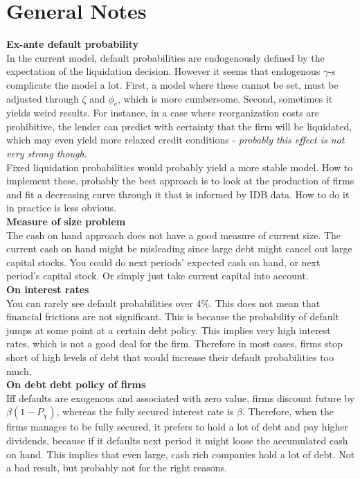 \documentclass[12pt]{article}
\begin{document}
\newpage

\section*{General Notes}
\textbf{Ex-ante default probability} \\ 
In the current model, default probabilities are endogenously defined by the expectation of the liquidation decision. However it seems that endogenous $\gamma$-s complicate the model a lot. First, a model where these cannot be set, must be adjusted through $\zeta$ and $\phi_c$, which is more cumbersome. Second, sometimes it yields weird results. For instance, in a case where reorganization costs are prohibitive, the lender can predict with certainty that the firm will be liquidated, which may even yield more relaxed credit conditions - \textit{probably this effect is not very strong though}. \vspace{3mm} \\
Fixed liquidation probabilities would probably yield a more stable model. How to implement these, probably the best approach is to look at the production of firms and fit a decreasing curve through it that is informed by IDB data. How to do it in practice is less obvious. \vspace{3mm} \\
\textbf{Measure of size problem} \\
The cash on hand approach does not have a good measure of current size. The current cash on hand might be misleading since large debt might cancel out large capital stocks. You could do next periods' expected cash on hand, or next period's capital stock. Or simply just take current capital into account. \vspace{3mm} \\
\textbf{On interest rates} \\
You can rarely see default probabilities over 4\%. This does not mean that financial frictions are not significant. This is because the probability of default jumps at some point at a certain debt policy. This implies very high interest rates, which is not a good deal for the firm. Therefore in most cases, firms stop short of high levels of debt that would increase their default probabilities too much. \vspace{3mm} \\
\textbf{On debt debt policy of firms} \\
Iff defaults are exogenous and associated with zero value, firms discount future by $\beta(1-P_\chi)$, whereas the fully secured interest rate is $\beta$. Therefore, when the firms manages to be fully secured, it prefers to hold a lot of debt and pay higher dividends, because if it defaults next period it might loose the accumulated cash on hand. This implies that even large, cash rich companies hold a lot of debt. Not a bad result, but probably not for the right reasons. \vspace{3mm} \\
\end{document}
